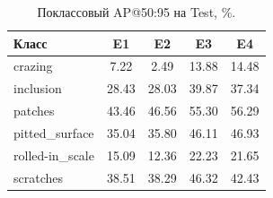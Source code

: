 \begin{table}[t]
\centering
\caption{Поклассовый AP@50:95 на Test, \%.}
\label{tab:per_class}
\scriptsize
\begin{tabular*}{\textwidth}{@{\extracolsep{\fill}}lcccc}
\hline
Класс & E1 & E2 & E3 & E4 \\
\hline
crazing & 7.22 & 2.49 & 13.88 & 14.48 \\
inclusion & 28.43 & 28.03 & 39.87 & 37.34 \\
patches & 43.46 & 46.56 & 55.30 & 56.29 \\
pitted\_surface & 35.04 & 35.80 & 46.11 & 46.93 \\
rolled-in\_scale & 15.09 & 12.36 & 22.23 & 21.65 \\
scratches & 38.51 & 38.29 & 46.32 & 42.43 \\
\hline
\end{tabular*}
\end{table}
